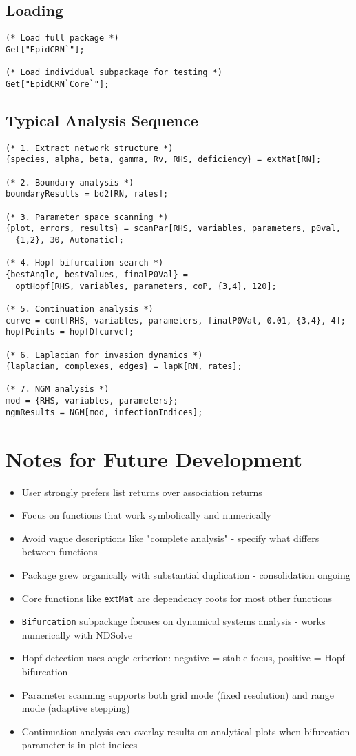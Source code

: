 \documentclass{article}
\begin{document}
\subsection{Loading}
\begin{lstlisting}
(* Load full package *)
Get["EpidCRN`"];

(* Load individual subpackage for testing *)
Get["EpidCRN`Core`"];
\end{lstlisting}

\subsection{Typical Analysis Sequence}
\begin{lstlisting}
(* 1. Extract network structure *)
{species, alpha, beta, gamma, Rv, RHS, deficiency} = extMat[RN];

(* 2. Boundary analysis *)
boundaryResults = bd2[RN, rates];

(* 3. Parameter space scanning *)
{plot, errors, results} = scanPar[RHS, variables, parameters, p0val,
  {1,2}, 30, Automatic];

(* 4. Hopf bifurcation search *)
{bestAngle, bestValues, finalP0Val} =
  optHopf[RHS, variables, parameters, coP, {3,4}, 120];

(* 5. Continuation analysis *)
curve = cont[RHS, variables, parameters, finalP0Val, 0.01, {3,4}, 4];
hopfPoints = hopfD[curve];

(* 6. Laplacian for invasion dynamics *)
{laplacian, complexes, edges} = lapK[RN, rates];

(* 7. NGM analysis *)
mod = {RHS, variables, parameters};
ngmResults = NGM[mod, infectionIndices];
\end{lstlisting}

\section{Notes for Future Development}

\begin{itemize}
\item User strongly prefers list returns over association returns
\item Focus on functions that work symbolically and numerically
\item Avoid vague descriptions like "complete analysis" - specify what differs between functions
\item Package grew organically with substantial duplication - consolidation ongoing
\item Core functions like \texttt{extMat} are dependency roots for most other functions
\item \texttt{Bifurcation} subpackage focuses on dynamical systems analysis - works numerically with NDSolve
\item Hopf detection uses angle criterion: negative = stable focus, positive = Hopf bifurcation
\item Parameter scanning supports both grid mode (fixed resolution) and range mode (adaptive stepping)
\item Continuation analysis can overlay results on analytical plots when bifurcation parameter is in plot indices
\end{itemize}
\end{document}
